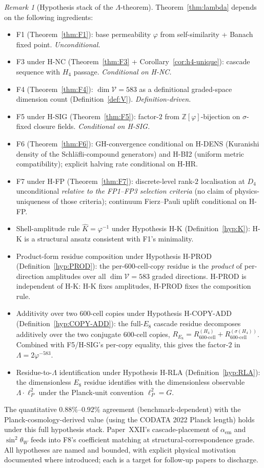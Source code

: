 \documentclass[12pt]{article}
\theoremstyle{definition}
\theoremstyle{remark}
\newtheorem{remark}[theorem]{Remark}
\newcommand{\Vcal}{\mathcal{V}}
\newcommand{\Zphi}{\mathbb{Z}[\varphi]}
\begin{document}
\begin{remark}[Hypothesis stack of the $\Lambda$-theorem]\label{rem:lambda-status}
Theorem~\ref{thm:lambda} depends on the following ingredients:
\begin{itemize}
\item F1 (Theorem~\ref{thm:F1}): base permeability $\varphi$ from self-similarity + Banach fixed point. \emph{Unconditional.}
\item F3 under H-NC (Theorem~\ref{thm:F3} + Corollary~\ref{cor:h4-unique}): cascade sequence with $H_4$ passage. \emph{Conditional on H-NC.}
\item F4 (Theorem~\ref{thm:F4}): $\dim\Vcal = 583$ as a definitional graded-space dimension count (Definition~\ref{def:V}). \emph{Definition-driven.}
\item F5 under H-SIG (Theorem~\ref{thm:F5}): factor-$2$ from $\Zphi$-bijection on $\sigma$-fixed closure fields. \emph{Conditional on H-SIG.}
\item F6 (Theorem~\ref{thm:F6}): GH-convergence conditional on H-DENS (Kuranishi density of the Schl\"afli-compound generators) and H-BI2 (uniform metric compatibility); explicit halving rate conditional on H-HR.
\item F7 under H-FP (Theorem~\ref{thm:F7}): discrete-level rank-$2$ localisation at $D_4$ unconditional \emph{relative to the FP1--FP3 selection criteria} (no claim of physics-uniqueness of those criteria); continuum Fierz--Pauli uplift conditional on H-FP.
\item Shell-amplitude rule $\widehat{K} = \varphi^{-1}$ under Hypothesis H-K (Definition~\ref{hyp:K}): H-K is a structural ansatz consistent with F1's minimality.
\item Product-form residue composition under Hypothesis H-PROD (Definition~\ref{hyp:PROD}): the per-600-cell-copy residue is the \emph{product} of per-direction amplitudes over all $\dim \Vcal = 583$ graded directions. H-PROD is independent of H-K: H-K fixes amplitudes, H-PROD fixes the composition rule.
\item Additivity over two 600-cell copies under Hypothesis H-COPY-ADD (Definition~\ref{hyp:COPY-ADD}): the full-$E_8$ cascade residue decomposes additively over the two conjugate 600-cell copies, $R_{E_8} = R_{600\text{-cell}}^{(H_4)} + R_{600\text{-cell}}^{(\sigma(H_4))}$. Combined with F5/H-SIG's per-copy equality, this gives the factor-$2$ in $\Lambda = 2\varphi^{-583}$.
\item Residue-to-$\Lambda$ identification under Hypothesis H-RLA (Definition~\ref{hyp:RLA}): the dimensionless $E_8$ residue identifies with the dimensionless observable $\Lambda \cdot \ell_P^2$ under the Planck-unit convention $\ell_P^2 = G$.
\end{itemize}
The quantitative $0.88\%$--$0.92\%$ agreement (benchmark-dependent) with the Planck-cosmology-derived value (using the CODATA 2022 Planck length) holds under this full hypothesis stack. Paper~XXII's cascade-placement of $\alpha_{\mathrm{em}}$ and $\sin^2\theta_W$ feeds into F8's coefficient matching at structural-correspondence grade. All hypotheses are named and bounded, with explicit physical motivation documented where introduced; each is a target for follow-up papers to discharge.
\end{remark}
\end{document}
